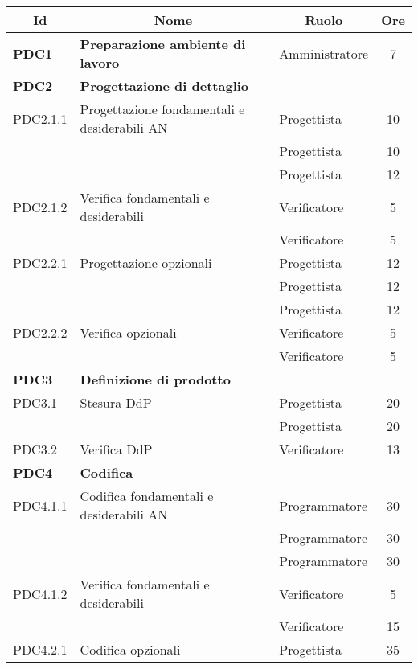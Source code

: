\begin{table}[H]
\begin{adjustwidth}{-4cm}{-4cm}
	\centering
	\begin{tabular}{ l l l c  }
	\hline
	\multicolumn{1}{c}{\textbf{Id}} & 
	\multicolumn{1}{c}{\textbf{Nome}} & 
	\multicolumn{1}{c}{\textbf{Ruolo}}& 
	\multicolumn{1}{c}{\textbf{Ore}} \\
	\hline
	
	\textbf{PDC1} & \textbf{Preparazione ambiente di lavoro} & Amministratore & 7\\

	\hline
	\textbf{PDC2} & \textbf{Progettazione di dettaglio} \\
	\cline{3-4}
	PDC2.1.1 & Progettazione fondamentali e desiderabili AN & Progettista & 10\\ 
    & & Progettista & 10\\
    & & Progettista & 12\\
    \cline{3-4}
	PDC2.1.2 & Verifica fondamentali e desiderabili & Verificatore & 5\\
	& & Verificatore & 5\\
	\cline{3-4}
	PDC2.2.1 & Progettazione opzionali & Progettista & 12\\ 
    & & Progettista & 12\\
    & & Progettista & 12\\
	\cline{3-4}
	PDC2.2.2 & Verifica opzionali & Verificatore & 5\\	
	& & Verificatore & 5\\
	\hline
	\textbf{PDC3} & \textbf{Definizione di prodotto} \\
	\cline{3-4}
	PDC3.1 & Stesura DdP & Progettista & 20\\ 
	 & & Progettista & 20\\
    \cline{3-4}
	PDC3.2 & Verifica DdP & Verificatore &  13\\
	\hline
	\textbf{PDC4} & \textbf{Codifica} \\
	\cline{3-4}
	PDC4.1.1 & Codifica fondamentali e desiderabili AN & Programmatore & 30\\ 
    & & Programmatore & 30\\
    & & Programmatore & 30\\
    \cline{3-4}
	PDC4.1.2 & Verifica fondamentali e desiderabili & Verificatore & 5\\
	& & Verificatore & 15\\
	\cline{3-4}
	PDC4.2.1 & Codifica opzionali & Progettista & 35\\ 

\end{tabular}
\end{adjustwidth}
\end{table}
